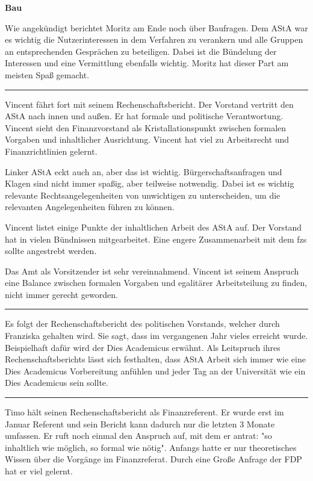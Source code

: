 \documentclass[ngerman,headheight=70pt]{scrartcl}
\begin{document}
    \textbf{Bau}

    Wie angekündigt berichtet Moritz am Ende noch über Baufragen.
    Dem AStA war es wichtig die Nutzerinteressen in dem Verfahren zu verankern
    und alle Gruppen an entsprechenden Gesprächen zu beteiligen.
    Dabei ist die Bündelung der Interessen und eine Vermittlung ebenfalls wichtig.
    Moritz hat dieser Part am meisten Spaß gemacht.

    \hrule

    Vincent fährt fort mit seinem Rechenschaftsbericht.
    Der Vorstand vertritt den AStA nach innen und außen. Er hat formale und
    politische Verantwortung. Vincent sieht den Finanzvorstand als Kristallationspunkt
    zwischen formalen Vorgaben und inhaltlicher Ausrichtung. Vincent hat viel
    zu Arbeitsrecht und Finanzrichtlinien gelernt.

    Linker AStA eckt auch an, aber das ist wichtig. Bürgerschaftsanfragen und
    Klagen sind nicht immer spaßig, aber teilweise notwendig. Dabei ist es wichtig
    relevante Rechtsangelegenheiten von unwichtigen zu unterscheiden, um die
    relevanten Angelegenheiten führen zu können.

    Vincent listet einige Punkte der inhaltlichen Arbeit des AStA auf. Der Vorstand
    hat in vielen Bündnissen mitgearbeitet. Eine engere Zusammenarbeit mit dem fzs
    sollte angestrebt werden.

    Das Amt als Vorsitzender ist sehr vereinnahmend. Vincent ist seinem Anspruch
    eine Balance zwischen formalen Vorgaben und egalitärer Arbeitsteilung zu finden,
    nicht immer gerecht geworden.

    \hrule

    Es folgt der Rechenschaftsbericht des politischen Vorstands, welcher durch
    Franziska gehalten wird. Sie sagt, dass im vergangenen Jahr vieles
    erreicht wurde. Beispielhaft dafür wird der Dies Academicus erwähnt.
    Als Leitspruch ihres Rechenschaftsberichts lässt sich festhalten,
    dass AStA Arbeit sich immer wie eine Dies Academicus Vorbereitung anfühlen
    und jeder Tag an der Universität wie ein Dies Academicus sein sollte.

    \hrule

    Timo hält seinen Rechenschaftsbericht als Finanzreferent. Er wurde erst im
    Januar Referent und sein Bericht kann dadurch nur die letzten 3 Monate umfassen.
    Er ruft noch einmal den Anspruch auf, mit dem er antrat: "so inhaltlich wie
    möglich, so formal wie nötig". Anfangs hatte er nur theoretisches Wissen
    über die Vorgänge im Finanzreferat. Durch eine Große Anfrage der FDP hat
    er viel gelernt.
\end{document}
